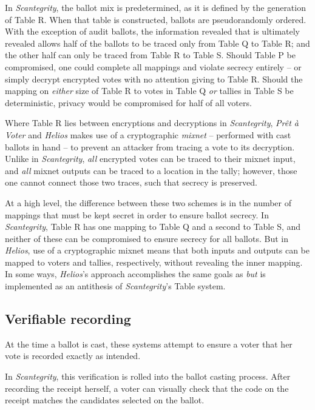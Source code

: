 \documentclass[10pt,twocolumn]{article}
\newcommand{\term}[1]{\textit{#1}}
\newcommand{\preta}{Pr\^{e}t \`{a}}
\newcommand{\pv}{\preta{} Voter}
\begin{document}
In \term{Scantegrity}, the ballot mix is predetermined, as it is defined by the generation of Table R.
When that table is constructed, ballots are pseudorandomly ordered. With the exception of audit
ballots, the information revealed that is ultimately revealed allows half of the ballots to be
traced only from Table Q to Table R; and the other half can only be traced from Table R to Table S.
Should Table P be compromised, one could complete all mappings and violate secrecy entirely -- or
simply decrypt encrypted votes with no attention giving to Table R. Should the mapping on
\emph{either} size of Table R to votes in Table Q \emph{or} tallies in Table S be deterministic,
privacy would be compromised for half of all voters.

Where Table R lies between encryptions and decryptions in \term{Scantegrity}, \term{\pv{}} and \term{Helios} makes use of a
cryptographic \term{mixnet} -- performed with cast ballots in hand -- to prevent an attacker from
tracing a vote to its decryption. Unlike in \term{Scantegrity}, \emph{all} encrypted votes can be traced to
their mixnet input, and \emph{all} mixnet outputs can be traced to a location in the tally; however,
those one cannot connect those two traces, such that secrecy is preserved.

At a high level, the difference between these two schemes is in the number of mappings that must be
kept secret in order to ensure ballot secrecy. In \term{Scantegrity}, Table R has one mapping to Table Q
and a second to Table S, and neither of these can be compromised to ensure secrecy for all ballots.
But in \term{Helios}, use of a cryptographic mixnet means that both inputs and outputs can be mapped to
voters and tallies, respectively, without revealing the inner mapping. In some ways, \term{Helios}'s
approach accomplishes the same goals as \emph{but} is implemented as an antithesis of \term{Scantegrity}'s
Table system.

\subsection{Verifiable recording}

At the time a ballot is cast, these systems attempt to ensure a voter that her
vote is recorded exactly as intended.

In \term{Scantegrity}, this verification is rolled into the ballot casting process. After recording the
receipt herself, a voter can visually check that the code on the receipt matches the candidates
selected on the ballot.
\end{document}
